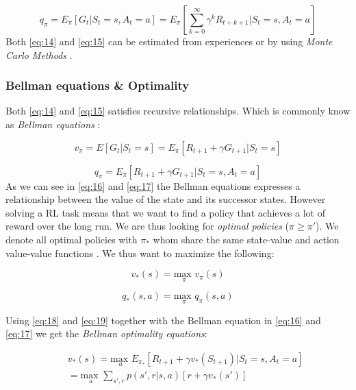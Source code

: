 \documentclass{kththesis}
\theoremstyle{definition}
\begin{document}
\begin{equation}
    \label{eq:15}
    q_{\pi} = E_{\pi}[G_t | S_t =s, A_t = a] = E_{\pi} \left[\sum_{k=0}^{\infty}{\gamma^{k}R_{t+k+1}} | S_t=s, A_t=a \right]
\end{equation}
Both \autoref{eq:14} and \autoref{eq:15} can be estimated from experiences or by using \textit{Monte Carlo Methods} \parencite{sutton1998reinforcement}.

\subsubsection*{Bellman equations \& Optimality}
Both \autoref{eq:14} and \autoref{eq:15} satisfies recursive relationships. Which is commonly know as \textit{Bellman equations} \parencite{sutton1998reinforcement}:

\begin{equation}
    \label{eq:16}
    v_{\pi} = E[G_t | S_t = s] = E_{\pi}[R_{t+1} + \gamma G_{t+1} | S_t = s]
\end{equation}

\begin{equation}
    \label{eq:17}
    q_{\pi} = E_{\pi}[R_{t+1} + \gamma G_{t+1} | S_t = s,  A_t = a]
\end{equation}
As we can see in \autoref{eq:16} and \autoref{eq:17} the Bellman equations expresses a relationship between the value of the state and its successor states. However solving a RL task means that we want to find a policy that achieves a lot of reward over the long run. We are thus looking for \textit{optimal policies} ($\pi \geq \pi'$). We denote all optimal policies with $\pi_{*}$ whom share the same state-value and action value-value functions \parencite{sutton1998reinforcement}. We thus want to maximize the following:

\begin{equation}
    \label{eq:18}
    v_{*}(s) = \underset{\pi}{\text{max }} v_{\pi}(s)
\end{equation}

\begin{equation}
    \label{eq:19}
    q_{*}(s,a) = \underset{\pi}{\text{max }} q_{\pi}(s,a)
\end{equation}

Using \autoref{eq:18} and \autoref{eq:19} together with the Bellman equation in \autoref{eq:16} and \autoref{eq:17} we get the \textit{Bellman optimality equations}:

\begin{equation}
\label{eq:20}
\begin{aligned}
& & v_{*}(s) =  \underset{a}{\text{max }} 
E_{\pi_{*}}[R_{t+1} + \gamma v_{*}(S_{t+1}) | S_t =s, A_t = a] \\
& & = \underset{a}{\text{max }} 
\sum_{s', r}^{}{p(s', r | s,a)}[r + \gamma v_{*}(s')]
\end{aligned}
\end{equation}
\end{document}
